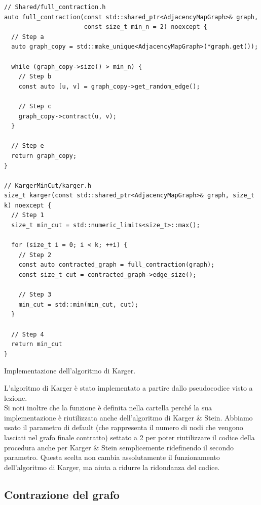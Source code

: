 \begin{listing}[!ht]
\begin{verbatim}
// Shared/full_contraction.h
auto full_contraction(const std::shared_ptr<AdjacencyMapGraph>& graph,
                      const size_t min_n = 2) noexcept {
  // Step a
  auto graph_copy = std::make_unique<AdjacencyMapGraph>(*graph.get());

  while (graph_copy->size() > min_n) {
    // Step b
    const auto [u, v] = graph_copy->get_random_edge();

    // Step c
    graph_copy->contract(u, v);
  }

  // Step e
  return graph_copy;
}

// KargerMinCut/karger.h
size_t karger(const std::shared_ptr<AdjacencyMapGraph>& graph, size_t k) noexcept {
  // Step 1
  size_t min_cut = std::numeric_limits<size_t>::max();

  for (size_t i = 0; i < k; ++i) {
    // Step 2
    const auto contracted_graph = full_contraction(graph);
    const size_t cut = contracted_graph->edge_size();

    // Step 3
    min_cut = std::min(min_cut, cut);
  }

  // Step 4
  return min_cut
}
\end{verbatim}
\caption{Implementazione dell'algoritmo di Karger.}
\label{listing:karger}
\end{listing}

\noindent L'algoritmo di Karger è stato implementato a partire dallo pseudocodice visto a lezione. \\

\vspace{10pt}
\noindent Si noti inoltre che la funzione  è definita nella cartella  perché la sua implementazione è riutilizzata anche dell'algoritmo di Karger \& Stein. Abbiamo usato il parametro di default  (che rappresenta il numero di nodi che vengono lasciati nel grafo finale contratto) settato a 2 per poter riutilizzare il codice della procedura anche per Karger \& Stein semplicemente ridefinendo il secondo parametro. Questa scelta non cambia assolutamente il funzionamento dell'algoritmo di Karger, ma aiuta a ridurre la ridondanza del codice.

\subsection{Contrazione del grafo}
\label{sub:karger-contraction}

